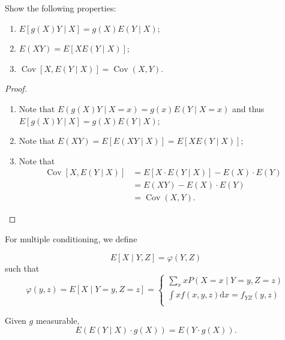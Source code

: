\documentclass[11pt,singlecolumn, openany, citestyle=authoryear]{elegantbook}
\begin{document}
\begin{CJK}{UTF8}{gbsn}
\begin{exercise}
    Show the following properties:
    \begin{enumerate}
        \item $E[g(X)Y\mid X]=g(X)E(Y\mid X)$;
        \item $E(XY)=E[XE(Y\mid X)]$;
        \item $\operatorname*{Cov}[X,E(Y\mid X)]=\operatorname*{Cov}(X,Y)$.
    \end{enumerate}
\end{exercise}
\begin{proof}
    \begin{enumerate}
        \item Note that 
        $E(g(X)Y\mid X=x)=g(x)E(Y\mid X=x)$ and thus 
        $E[g(X)Y\mid X]=g(X)E(Y\mid X)$;
        \item Note that 
        $E(XY)=E[E(XY\mid X)]=E[XE(Y\mid X)]$;
        \item Note that 
        \begin{align*}
            \operatorname*{Cov}[X,E(Y\mid X)]&= E[X\cdot E(Y\mid X)]-E(X)\cdot E(Y)\\
            &=E(XY)-E(X)\cdot E(Y)\\
            &=\operatorname*{Cov}(X,Y).
        \end{align*}
    \end{enumerate}
\end{proof}

For multiple conditioning, we define 
\begin{definition}
    $$
    E[X\mid Y,Z] = \varphi (Y,Z)
    $$
    such that 
    $$
    \varphi(y,z)=E[X\mid Y=y,Z=z]=
    \begin{cases}
        \displaystyle \sum_x x P(X=x\mid Y=y,Z=z)\\
        \displaystyle \int x f(x,y,z)\mathrm{d}x = f_{YZ}(y,z)\\
    \end{cases}
    $$
\end{definition}
\begin{proposition}
    Given $g$ measurable,
    $$
    E(E(Y\mid X)\cdot g(X)) = E(Y\cdot g(X)).
    $$
\end{proposition}


\end{CJK}
\end{document}
